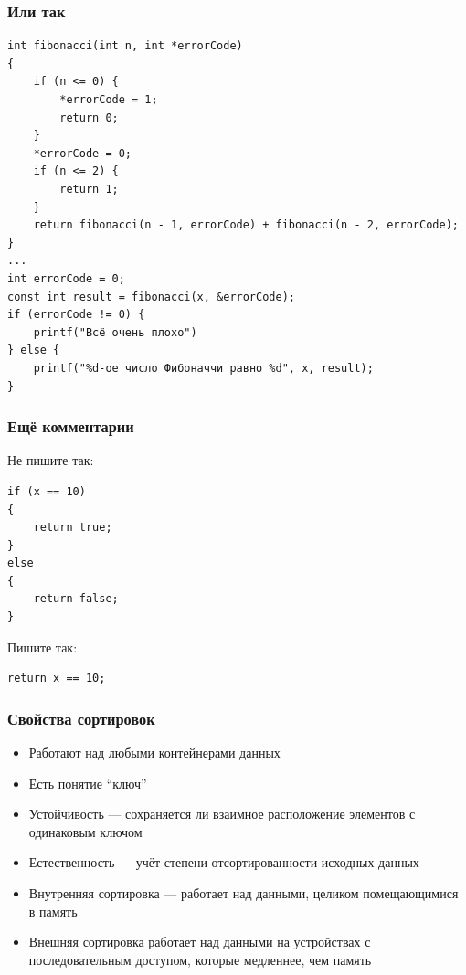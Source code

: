 \documentclass{../../slides-style}
\begin{document}
    \begin{frame}[fragile]
        \frametitle{Или так}
        \begin{scriptsize}
            \begin{verbatim}
int fibonacci(int n, int *errorCode)
{
    if (n <= 0) {
        *errorCode = 1;
        return 0;
    } 
    *errorCode = 0;
    if (n <= 2) { 
        return 1;
    }
    return fibonacci(n - 1, errorCode) + fibonacci(n - 2, errorCode);
}
...
int errorCode = 0;
const int result = fibonacci(x, &errorCode);
if (errorCode != 0) {
    printf("Всё очень плохо")
} else {
    printf("%d-ое число Фибоначчи равно %d", x, result);
}
            \end{verbatim}
        \end{scriptsize}
    \end{frame}

    \begin{frame}[fragile]
        \frametitle{Ещё комментарии}
        Не пишите так:
        \begin{verbatim}
if (x == 10) 
{
    return true;
}
else
{
    return false;
}
        \end{verbatim}
        Пишите так:
        \begin{verbatim}
return x == 10;
        \end{verbatim}
    \end{frame}

    
    \begin{frame}
        \frametitle{Свойства сортировок}
        \begin{itemize}
            \item Работают над любыми контейнерами данных
            \item Есть понятие \enquote{ключ}
            \item Устойчивость --- сохраняется ли взаимное расположение элементов с одинаковым ключом
            \item Естественность --- учёт степени отсортированности исходных данных
            \item Внутренняя сортировка --- работает над данными, целиком помещающимися в память
            \item Внешняя сортировка работает над данными на устройствах с последовательным доступом, которые медленнее, чем память
        \end{itemize}
    \end{frame}
\end{document}
